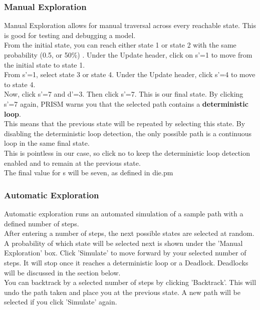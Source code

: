 \documentclass[a4paper]{article}
\begin{document}
\subsubsection{Manual Exploration}

Manual Exploration allows for manual traversal across every reachable state. This is good for testing and debugging a model. 
\\[1\baselineskip]
From the initial state, you can reach either state 1 or state 2 with the same probability (0.5, or 50\%) . Under the Update header, click on s'=1 to move from the initial state to state 1.
\\[1\baselineskip]
From s'=1, select state 3 or state 4. Under the Update header, click s'=4 to move to state 4.
\\[1\baselineskip]
Now, click s'=7 and d'=3. Then click s'=7. This is our final state. By clicking s'=7 again, PRISM warns you that the selected path contains a \textbf{deterministic loop}. 
\\[1\baselineskip]
This means that the previous state will be repeated by selecting this state. By disabling the deterministic loop detection, the only possible path is a continuous loop in the same final state. 
\\[1\baselineskip]
This is pointless in our case, so click no to keep the deterministic loop detection enabled and to remain at the previous state.
\\[1\baselineskip]
The final value for s will be seven, as defined in die.pm


\subsubsection{Automatic Exploration}

Automatic exploration runs an automated simulation of a sample path with a defined number of steps.
\\[1\baselineskip]
After entering a number of steps, the next possible states are selected at random. A probability of which state will be selected next is shown under the 'Manual Exploration' box. Click 'Simulate' to move forward by your selected number of steps. It will stop once it reaches a deterministic loop or a Deadlock. Deadlocks will be discussed in the section below. 
\\[1\baselineskip]
You can backtrack by a selected number of steps by clicking 'Backtrack'. This will undo the path taken and place you at the previous state. A new path will be selected if you click 'Simulate' again.
\end{document}
